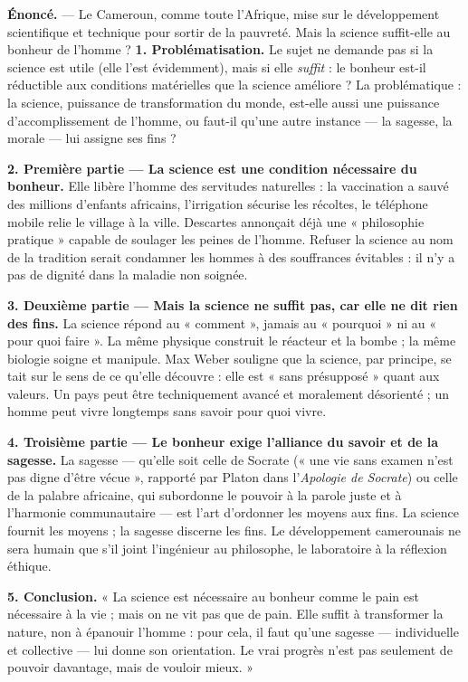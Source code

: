 \documentclass[11pt]{article}
\begin{document}
\begin{exoresolu}
\textbf{Énoncé.} — Le Cameroun, comme toute l'Afrique, mise sur le développement scientifique et technique pour sortir de la pauvreté. Mais la science suffit-elle au bonheur de l'homme ?
\tcblower
\textbf{1. Problématisation.} Le sujet ne demande pas si la science est utile (elle l'est évidemment), mais si elle \emph{suffit} : le bonheur est-il réductible aux conditions matérielles que la science améliore ? La problématique : la science, puissance de transformation du monde, est-elle aussi une puissance d'accomplissement de l'homme, ou faut-il qu'une autre instance — la sagesse, la morale — lui assigne ses fins ?

\textbf{2. Première partie — La science est une condition nécessaire du bonheur.} Elle libère l'homme des servitudes naturelles : la vaccination a sauvé des millions d'enfants africains, l'irrigation sécurise les récoltes, le téléphone mobile relie le village à la ville. Descartes annonçait déjà une « philosophie pratique » capable de soulager les peines de l'homme. Refuser la science au nom de la tradition serait condamner les hommes à des souffrances évitables : il n'y a pas de dignité dans la maladie non soignée.

\textbf{3. Deuxième partie — Mais la science ne suffit pas, car elle ne dit rien des fins.} La science répond au « comment », jamais au « pourquoi » ni au « pour quoi faire ». La même physique construit le réacteur et la bombe ; la même biologie soigne et manipule. Max Weber souligne que la science, par principe, se tait sur le sens de ce qu'elle découvre : elle est « sans présupposé » quant aux valeurs. Un pays peut être techniquement avancé et moralement désorienté ; un homme peut vivre longtemps sans savoir pour quoi vivre.

\textbf{4. Troisième partie — Le bonheur exige l'alliance du savoir et de la sagesse.} La sagesse — qu'elle soit celle de Socrate (« une vie sans examen n'est pas digne d'être vécue », rapporté par Platon dans l'\emph{Apologie de Socrate}) ou celle de la palabre africaine, qui subordonne le pouvoir à la parole juste et à l'harmonie communautaire — est l'art d'ordonner les moyens aux fins. La science fournit les moyens ; la sagesse discerne les fins. Le développement camerounais ne sera humain que s'il joint l'ingénieur au philosophe, le laboratoire à la réflexion éthique.

\textbf{5. Conclusion.} « La science est nécessaire au bonheur comme le pain est nécessaire à la vie ; mais on ne vit pas que de pain. Elle suffit à transformer la nature, non à épanouir l'homme : pour cela, il faut qu'une sagesse — individuelle et collective — lui donne son orientation. Le vrai progrès n'est pas seulement de pouvoir davantage, mais de vouloir mieux. »
\end{exoresolu}
\end{document}
